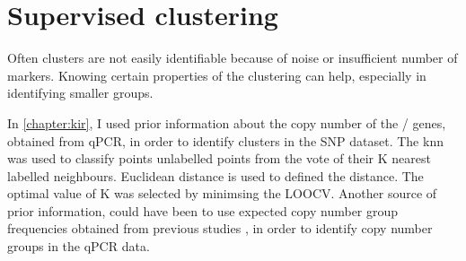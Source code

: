 
\section{Supervised clustering}

Often clusters are not easily identifiable because of noise or insufficient number of markers.
Knowing certain properties of the clustering can help, especially in identifying smaller groups.

In \cref{chapter:kir}, I used prior information about the copy number of the / genes, obtained from qPCR,
in order to identify clusters in the SNP dataset.
The \gls{knn} was used to classify points unlabelled points from the vote of their K nearest labelled neighbours.
Euclidean distance is used to defined the distance.
The optimal value of K was selected by minimsing the \gls{LOOCV}.
Another source of prior information,
could have been to use expected copy number group frequencies obtained from previous studies 
\citet{Jiang:2012cf}, in order to identify copy number groups in the qPCR data.

